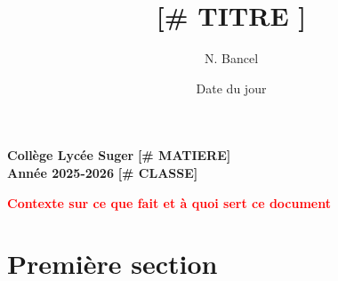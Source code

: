 \documentclass[answers]{exam}
\title{[# TITRE
]}
\author{N. Bancel}
\date{Date du jour}
\begin{document}
\textbf{Collège Lycée Suger}
\hfill
\textbf{[# MATIERE]} \\

\textbf{Année 2025-2026}
\hfill
\textbf{[# CLASSE]} \par

{\let\newpage\relax\maketitle}

\begin{center}
  \textbf{\textcolor{red}{Contexte sur ce que fait et à quoi sert ce document}} \\
\end{center}

\section{Première section}
\end{document}
